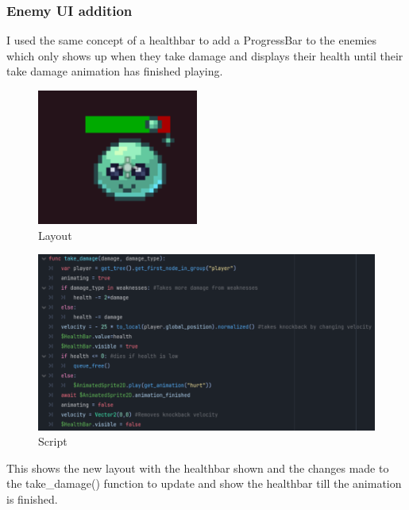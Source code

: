 \documentclass{article}
\begin{document}
        \subsubsection{Enemy UI addition}
        I used the same concept of a healthbar to add a ProgressBar to the enemies which only shows up when they take damage and displays their health until their take damage animation has finished playing.\\
        \begin{multicols}{2}
        \begin{figure}[H]
                \centering
                \includegraphics[width = 0.6\columnwidth]{images/development/Enemy_healthbar.PNG}
                \caption{Layout}
        \end{figure}
        \begin{figure}[H]
                \centering
                \includegraphics[width = 1.2\columnwidth]{images/development/Enemy_take_damage2.PNG}
                \caption{Script}
        \end{figure}
        \end{multicols}
        This shows the new layout with the healthbar shown and the changes made to the take\_damage() function to update and show the healthbar till the animation is finished.\\
\end{document}
